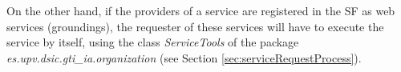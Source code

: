 On the other hand, if the providers of a service are registered in the SF as web services (groundings), the requester of these services will have to execute the service by itself, using the class \textit{ServiceTools} of the package \textit{es.upv.dsic.gti\_ia.organization} (see Section \ref{sec:serviceRequestProcess}).



%
%
%
%
%
%
%
%





